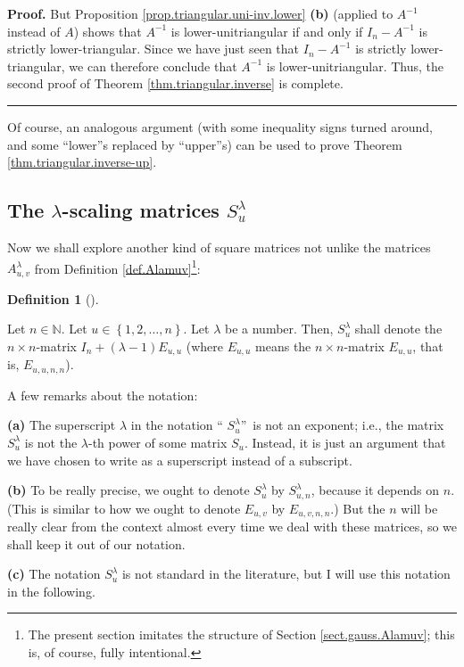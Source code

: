 \documentclass[numbers=enddot,12pt,final,onecolumn,notitlepage]{scrartcl}%
\theoremstyle{definition}
\newtheorem{defi}[theo]{Definition}
\newenvironment{definition}[1][]
{\begin{defi}[#1]\begin{leftbar}}
{\end{leftbar}\end{defi}}
\newenvironment{proof}[1][Proof]{\noindent\textbf{#1.} }{\ \rule{0.5em}{0.5em}}
\begin{document}
\begin{proof}
But Proposition \ref{prop.triangular.uni-inv.lower} \textbf{(b)} (applied to
$A^{-1}$ instead of $A$) shows that $A^{-1}$ is lower-unitriangular if and
only if $I_{n}-A^{-1}$ is strictly lower-triangular. Since we have just seen
that $I_{n}-A^{-1}$ is strictly lower-triangular, we can therefore conclude
that $A^{-1}$ is lower-unitriangular. Thus, the second proof of Theorem
\ref{thm.triangular.inverse} is complete.
\end{proof}

Of course, an analogous argument (with some inequality signs turned around,
and some \textquotedblleft lower\textquotedblright s replaced by
\textquotedblleft upper\textquotedblright s) can be used to prove Theorem
\ref{thm.triangular.inverse-up}.

\subsection{The $\lambda$-scaling matrices $S_{u}^{\lambda}$}

Now we shall explore another kind of square matrices not unlike the matrices
$A_{u,v}^{\lambda}$ from Definition \ref{def.Alamuv}\footnote{The present
section imitates the structure of Section \ref{sect.gauss.Alamuv}; this is, of
course, fully intentional.}:

\begin{definition}
\label{def.Slamu}Let $n\in\mathbb{N}$. Let $u\in\left\{  1,2,\ldots,n\right\}
$. Let $\lambda$ be a number. Then, $S_{u}^{\lambda}$ shall denote the
$n\times n$-matrix $I_{n}+\left(  \lambda-1\right)  E_{u,u}$ (where $E_{u,u}$
means the $n\times n$-matrix $E_{u,u}$, that is, $E_{u,u,n,n}$).

A few remarks about the notation:

\textbf{(a)} The superscript $\lambda$ in the notation \textquotedblleft%
$S_{u}^{\lambda}$\textquotedblright\ is not an exponent; i.e., the matrix
$S_{u}^{\lambda}$ is not the $\lambda$-th power of some matrix $S_{u}$.
Instead, it is just an argument that we have chosen to write as a superscript
instead of a subscript.

\textbf{(b)} To be really precise, we ought to denote $S_{u}^{\lambda}$ by
$S_{u,n}^{\lambda}$, because it depends on $n$. (This is similar to how we
ought to denote $E_{u,v}$ by $E_{u,v,n,n}$.) But the $n$ will be really clear
from the context almost every time we deal with these matrices, so we shall
keep it out of our notation.

\textbf{(c)} The notation $S_{u}^{\lambda}$ is not standard in the literature,
but I will use this notation in the following.
\end{definition}
\end{document}
